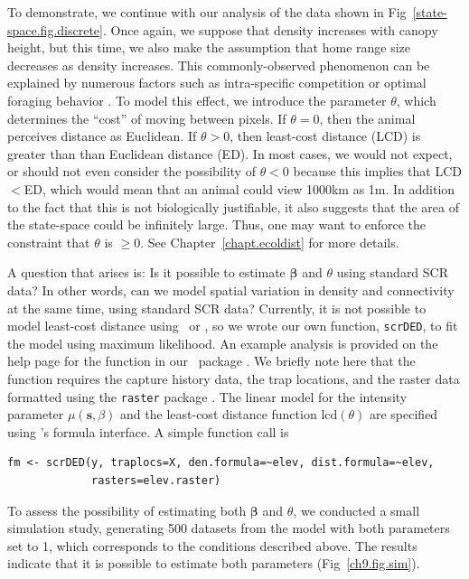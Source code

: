 To demonstrate, we continue with our analysis of the data shown in
Fig~\ref{state-space.fig.discrete}. Once again, we suppose that density
increases with canopy height, but this time, we also make the
assumption that home range size decreases as density increases. This
commonly-observed phenomenon can be explained by numerous factors such
as intra-specific competition \citep{sillett_etal:2004} or optimal
foraging behavior \citep{tufto_etal:1996,said_servanty:2005}. To model
this effect, we
introduce the parameter $\theta$, which determines the ``cost'' of
moving between pixels. If $\theta=0$, then the animal perceives
distance as Euclidean. If $\theta>0$, then least-cost distance (LCD)
is greater than than Euclidean distance (ED). In most cases, we would
not expect,
or should not even consider the possibility of $\theta<0$ because this
implies that LCD$<$ED, which would mean that an animal could view
1000km as 1m. In addition to the fact that this is not biologically
justifiable, it also suggests that the area of the state-space could
be infinitely large. Thus, one may want to enforce the constraint that
$\theta$ is $\geq 0$. See Chapter~\ref{chapt.ecoldist} for
more details.

A question that arises is: Is it possible to estimate $\bm \beta$
and $\theta$ using standard SCR data? In other words, can we model
spatial variation in density and connectivity at the same time,
using standard SCR data? Currently, it is not possible to
model least-cost distance using \jags~or \secr, so we wrote our own
function, \verb+scrDED+, to fit the model using maximum likelihood. An
example analysis is provided on the help page for the function in our
\R~package \scrbook. We briefly note here that the function requires
the capture history data, the trap locations, and the raster data
formatted using the {\tt raster} package
\citep{hijmans_vanetten:2012}. The linear model for the
intensity parameter $\mu(\mathbf{s}, \beta)$ and the least-cost distance
function $\text{lcd}(\theta)$ are specified using \R's formula interface. A
simple function call is
\begin{verbatim}
fm <- scrDED(y, traplocs=X, den.formula=~elev, dist.formula=~elev,
             rasters=elev.raster)
\end{verbatim}
To assess the possibility of estimating both $\bm \beta$ and $\theta$, we
conducted a small simulation study, generating 500 datasets from the
model with both parameters set to 1, which corresponds to the
conditions described above. The results indicate that it is
possible to estimate both parameters
(Fig~\ref{ch9.fig.sim}).

